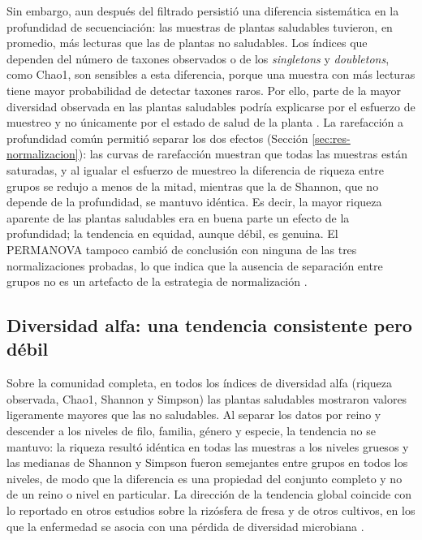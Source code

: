 Sin embargo, aun después del filtrado persistió una diferencia sistemática en la profundidad de
secuenciación: las muestras de plantas saludables tuvieron, en promedio, más lecturas que las de
plantas no saludables. Los índices que dependen del número de taxones observados o de los
\emph{singletons} y \emph{doubletons}, como Chao1, son sensibles a esta diferencia, porque una
muestra con más lecturas tiene mayor probabilidad de detectar taxones raros. Por ello, parte de la
mayor diversidad observada en las plantas saludables podría explicarse por el esfuerzo de muestreo
y no únicamente por el estado de salud de la planta \citep{mcmurdie2014waste}. La rarefacción a
profundidad común permitió separar los dos efectos (Sección \ref{sec:res-normalizacion}): las curvas de rarefacción
muestran que todas las muestras están saturadas, y al igualar el esfuerzo de muestreo la diferencia
de riqueza entre grupos se redujo a menos de la mitad, mientras que la de Shannon, que no depende
de la profundidad, se mantuvo idéntica. Es decir, la mayor riqueza aparente de las plantas saludables
era en buena parte un efecto de la profundidad; la tendencia en equidad, aunque débil, es genuina.
El PERMANOVA tampoco cambió de conclusión con ninguna de las tres normalizaciones probadas, lo que
indica que la ausencia de separación entre grupos no es un artefacto de la estrategia de
normalización \citep{weiss2017normalization}.

\subsection{Diversidad alfa: una tendencia consistente pero débil}

Sobre la comunidad completa, en todos los índices de diversidad alfa (riqueza observada, Chao1,
Shannon y Simpson) las plantas saludables mostraron valores ligeramente mayores que las no
saludables. Al separar los datos por reino y descender a los niveles de filo, familia, género y
especie, la tendencia no se mantuvo: la riqueza resultó idéntica en todas las muestras a los niveles
gruesos y las medianas de Shannon y Simpson fueron semejantes entre grupos en todos los niveles, de
modo que la diferencia es una propiedad del conjunto completo y no de un reino o nivel en
particular. La dirección de la tendencia global
coincide con lo reportado en otros estudios sobre la rizósfera de fresa y de otros cultivos, en los
que la enfermedad se asocia con una pérdida de diversidad microbiana
\citep{xiong2020rhizosphere, gao2021disease, yang2020comparison}.

